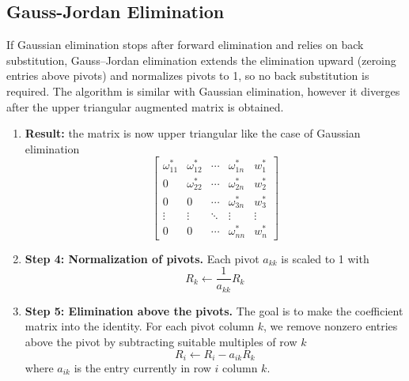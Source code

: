 \documentclass[../../../main.tex]{subfiles}
\begin{document}
\subsection{Gauss-Jordan Elimination}
If Gaussian elimination stops after forward elimination and relies on back substitution, Gauss–Jordan elimination extends the elimination upward (zeroing entries above pivots) and normalizes pivots to 1, so no back substitution is required.
The algorithm is similar with Gaussian elimination, however it diverges after the upper triangular augmented  matrix is obtained.
\begin{enumerate}
    \item \textbf{Result:} the matrix is now upper triangular like the case of Gaussian elimination
          \[
              \begin{bmatrix}
                  \omega_{11}^{*} & \omega_{12}^{*} & \cdots & \omega_{1n}^{*} & w_1^{*} \\
                  0               & \omega_{22}^{*} & \cdots & \omega_{2n}^{*} & w_2^{*} \\
                  0               & 0               & \cdots & \omega_{3n}^{*} & w_3^{*} \\
                  \vdots          & \vdots          & \ddots & \vdots          & \vdots  \\
                  0               & 0               & \cdots & \omega_{nn}^{*} & w_n^{*}
              \end{bmatrix}
          \]
    \item \textbf{Step 4: Normalization of pivots.}
          Each pivot $a_{kk}$ is scaled to 1 with
          \begin{equation*}
              R_k \leftarrow \frac{1 }{a_{kk}}R_k
          \end{equation*}
    \item \textbf{Step 5: Elimination above the pivots.}
          The goal is to make the coefficient matrix into the identity.
          For each pivot column $k$, we remove nonzero entries above the pivot by subtracting suitable multiples of row $k$
          \begin{equation*}
              R_i \leftarrow R_i -a_{ik}R_k
          \end{equation*}
          where $a_{ik}$ is the entry currently in row $i$ column $k$.
\end{enumerate}
\end{document}
